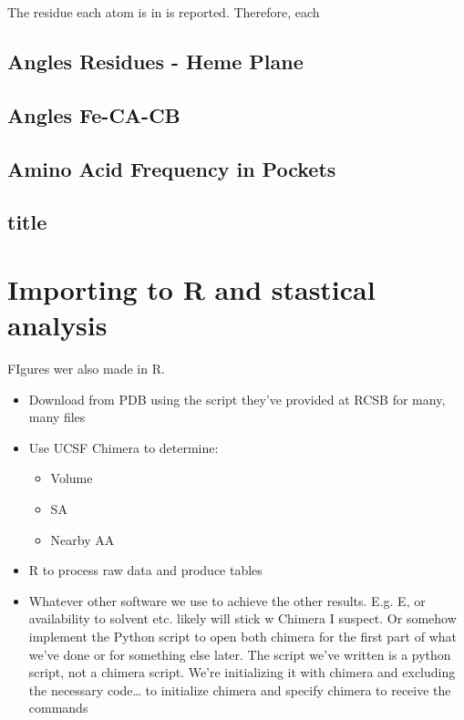 		The residue each atom is in is reported. Therefore, each
		
		\subsection*{Angles Residues - Heme Plane}
		
		\subsection*{Angles Fe-CA-CB}
		
		\subsection*{Amino Acid Frequency in Pockets}
		
		\subsection*{title}
	
	
	\section*{Importing to R and stastical analysis}
	
	FIgures wer also made in R. 
	
	
	\begin{itemize}
		
		
		
		
		\item Download from PDB using the script they’ve provided at RCSB for many, many files
		
		\item Use UCSF Chimera to determine:
		\begin{itemize}
			\item Volume
			\item SA
			\item Nearby AA
		\end{itemize}
		
		\item R to process raw data and produce tables
		\item Whatever other software we use to achieve the other results. E.g. E, or availability to solvent etc. likely will stick w Chimera I suspect. Or somehow implement the Python script to open both chimera for the first part of what we’ve done or for something else later. The script we’ve written is a python script, not a chimera script. We’re initializing it with chimera and excluding the necessary code… to initialize chimera and specify chimera to receive the commands
		
	\end{itemize}

